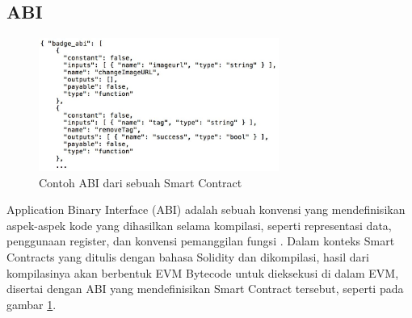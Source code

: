 \subsection{ABI}
\label{subsec:abi}

\begin{figure}[ht]
	\centering
	\includegraphics[width=0.7\textwidth]{resources/chapter-2/smart-contract-abi.jpg}
	\caption{Contoh ABI dari sebuah Smart Contract \parencite{third2017linked}}
	\label{image:abi-example}
\end{figure}

Application Binary Interface (ABI) adalah sebuah konvensi yang mendefinisikan aspek-aspek kode yang dihasilkan selama kompilasi, seperti representasi data, penggunaan register, dan konvensi pemanggilan fungsi \parencite{sciencedirect2024}. Dalam konteks Smart Contracts yang ditulis dengan bahasa Solidity dan dikompilasi, hasil dari kompilasinya akan berbentuk EVM Bytecode untuk dieksekusi di dalam EVM, disertai dengan ABI yang mendefinisikan Smart Contract tersebut, seperti pada gambar \ref{image:abi-example}.
